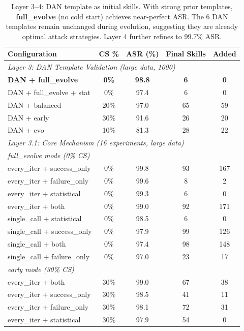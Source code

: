 \begin{table}[t]
\centering
\caption{Layer 3--4: DAN template as initial skills. With strong prior templates, \textbf{full\_evolve} (no cold start) achieves near-perfect ASR. The 6 DAN templates remain unchanged during evolution, suggesting they are already optimal attack strategies. Layer 4 further refines to 99.7\% ASR.}
\label{tab:layer3}
\small
\begin{tabular}{lcccc}
\toprule
\textbf{Configuration} & \textbf{CS \%} & \textbf{ASR (\%)} & \textbf{Final Skills} & \textbf{Added} \\
\midrule
\multicolumn{5}{l}{\textit{Layer 3: DAN Template Validation (large data, 1000)}} \\
\textbf{DAN + full\_evolve} & \textbf{0\%} & \textbf{98.8} & \textbf{6} & \textbf{0} \\
DAN + full\_evolve + stat & 0\% & 97.4 & 6 & 0 \\
DAN + balanced & 20\% & 97.0 & 65 & 59 \\
DAN + early & 30\% & 91.6 & 26 & 20 \\
DAN + evo & 10\% & 81.3 & 28 & 22 \\
\midrule
\multicolumn{5}{l}{\textit{Layer 3.1: Core Mechanism (16 experiments, large data)}} \\
\multicolumn{5}{l}{\textit{full\_evolve mode (0\% CS)}} \\
every\_iter + success\_only & 0\% & 99.8 & 93 & 167 \\
every\_iter + failure\_only & 0\% & 99.6 & 8 & 2 \\
every\_iter + statistical & 0\% & 99.3 & 6 & 0 \\
every\_iter + both & 0\% & 99.0 & 92 & 171 \\
single\_call + statistical & 0\% & 98.5 & 6 & 0 \\
single\_call + success\_only & 0\% & 97.9 & 99 & 126 \\
single\_call + both & 0\% & 97.4 & 98 & 148 \\
single\_call + failure\_only & 0\% & 97.0 & 23 & 17 \\
\multicolumn{5}{l}{\textit{early mode (30\% CS)}} \\
every\_iter + both & 30\% & 99.0 & 67 & 38 \\
every\_iter + success\_only & 30\% & 98.5 & 41 & 11 \\
every\_iter + failure\_only & 30\% & 98.1 & 72 & 31 \\
every\_iter + statistical & 30\% & 97.9 & 54 & 0 \\

\end{tabular}
\end{table}
